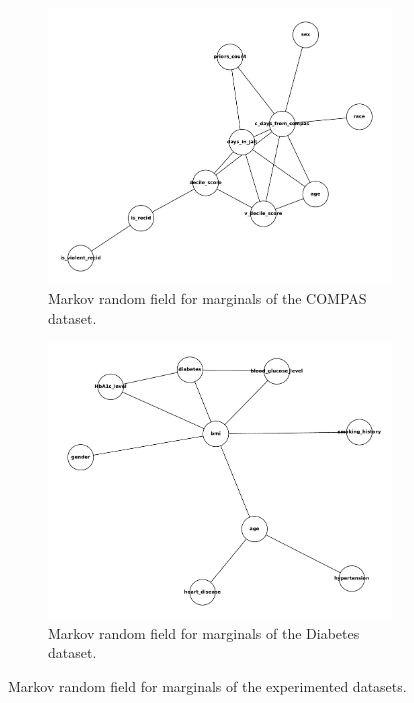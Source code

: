 \documentclass[manuscript,screen,review,anonymous]{acmart}
\begin{document}
\begin{figure}
\begin{subfigure}[b]{0.3\textwidth}
      \includegraphics[width=\textwidth]{compas_mst}
      \caption{Markov random field for marginals of the COMPAS dataset.}
      \label{fig:compas_mst}
  \end{subfigure}
  \hfill
  \begin{subfigure}[b]{0.3\textwidth}
      \centering
      \includegraphics[width=\textwidth]{diabetes_mst}
      \caption{Markov random field for marginals of the Diabetes dataset.}
      \label{fig:diabetes_mst}
  \end{subfigure}
      \caption{Markov random field for marginals of the experimented datasets.}
      \label{fig:msts}
\end{figure}
\end{document}
